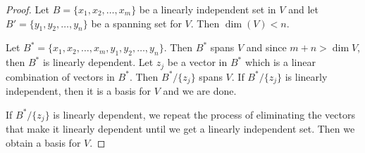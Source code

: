 \documentclass[11pt,a4paper]{article}
\theoremstyle{definition}
\begin{document}
\begin{proof}
Let $B=\{x_1,x_2,\dots,x_m\}$ be a linearly independent set in $V$ and let $B'=\{y_1,y_2,\dots,y_n\}$ be a spanning set for $V$. Then $\dim (V)<n$.

Let $B^*=\{x_1,x_2,\dots,x_m,y_1,y_2,\dots,y_n\}$. Then $B^*$ spans $V$ and since $m+n>\dim V$, then $B^*$ is linearly dependent. Let $z_j$ be a vector in $B^*$ which is a linear combination of vectors in $B^*$. Then $B^*/\{z_j\}$ spans $V$. If $B^*/\{z_j\}$ is linearly independent, then it is a basis for $V$ and we are done.

If $B^*/\{z_j\}$ is linearly dependent, we repeat the process of eliminating the vectors that make it linearly dependent until we get a linearly independent set. Then we obtain a basis for $V$.
\end{proof}
\end{document}
